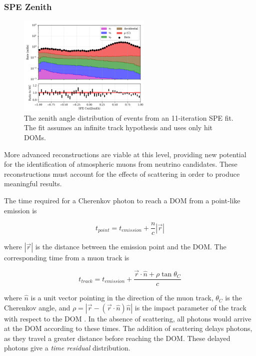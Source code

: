 \subsubsection{SPE Zenith}
\begin{figure}[h]
	\centering
		\includegraphics[width=2.5in]{SPE11_Cos(Zenith)_log.png}
		\caption[SPE Reconstruction Zenith Angles]{The zenith angle distribution of events from an 11-iteration SPE fit. The fit assumes an infinite track hypothesis and uses only hit DOMs.}
	\label{fig:spe11_zenith}
\end{figure}

More advanced reconstructions are viable at this level, providing new potential for the identification of atmospheric muons from neutrino candidates.
These reconstructions must account for the effects of scattering in order to produce meaningful results.

The time required for a Cherenkov photon to reach a DOM from a point-like emission is 

\begin{equation}
t_{point} = t_{emission} + \frac{n}{c} \left|\vec{r}\right| 
\end{equation}

where $\left|\vec{r}\right|$ is the distance between the emission point and the DOM.
The corresponding time from a muon track is 

\begin{equation}
t_{track} = t_{emission} + \frac{\vec{r} \cdot \hat{n} + \rho \tan \theta_C}{c}
\end{equation}

where $\hat{n}$ is a unit vector pointing in the direction of the muon track, $\theta_C$ is the Cherenkov angle, and $\rho = \left|\vec{r} - \left(\vec{r} \cdot \hat{n}\right) \hat{n}\right|$ is the impact parameter of the track with respect to the DOM \cite{Thesis-Jakob}.
In the absence of scattering, all photons would arrive at the DOM according to these times.
The addition of scattering delays photons, as they travel a greater distance before reaching the DOM.
These delayed photons give a \emph{time residual} distribution.

